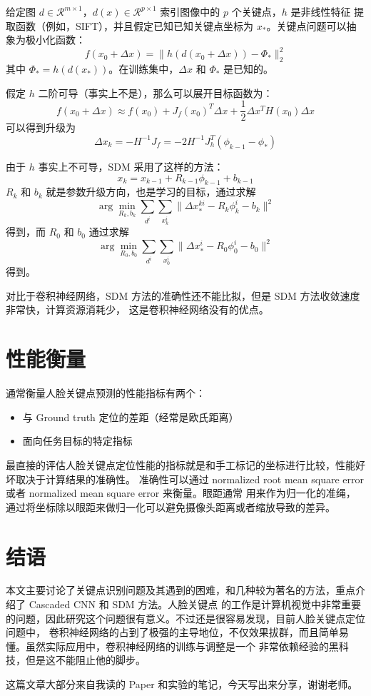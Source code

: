 \documentclass{ctexart}
\begin{document}
给定图 $d \in \mathcal{R}^{m\times 1}$，$d(x) \in \mathcal{R}^{p \times 1}$ 索引图像中的 $p$ 个关键点，$h$ 是非线性特征
提取函数（例如，SIFT），并且假定已知已知关键点坐标为 $x_*$。关键点问题可以抽象为极小化函数：
$$
f(x_0 + \Delta x) = \| h(d(x_0 + \Delta x)) - \Phi_* \|_2^2
$$
其中 $\Phi_* = h(d(x_*))$。在训练集中，$\Delta x$ 和 $\Phi_*$ 是已知的。

假定 $h$ 二阶可导（事实上不是），那么可以展开目标函数为：
$$
f(x_0 + \Delta x) \approx f(x_0) + J_f(x_0)^T \Delta x + \frac 1 2 \Delta x^T H(x_0) \Delta x
$$
可以得到升级为
$$
\Delta x_k = -H^{-1} J_f = -2 H^{-1} J_h^T(\phi_{k-1} - \phi_*)
$$

由于 $h$ 事实上不可导，SDM 采用了这样的方法：
$$
x_k = x_{k-1} + R_{k-1} \phi_{k-1} + b_{k-1}
$$
$R_k$ 和 $b_k$ 就是参数升级方向，也是学习的目标，通过求解
$$
\arg\min_{R_k, b_k} \sum_{d^i} \sum_{x_k^i} \| \Delta x_*^{ki} - R_k \phi_k^i - b_k \|^2
$$
得到，而 $R_0$ 和 $b_0$ 通过求解
$$
\arg\min_{R_0, b_0} \sum_{d^i} \sum_{x_0^i} \| \Delta x_*^{i} - R_0 \phi_0^i - b_0 \|^2
$$
得到。

对比于卷积神经网络，SDM 方法的准确性还不能比拟，但是 SDM 方法收敛速度非常快，计算资源消耗少，
这是卷积神经网络没有的优点。

\section{性能衡量}

通常衡量人脸关键点预测的性能指标有两个：

\begin{itemize}
	\item 与 Ground truth 定位的差距（经常是欧氏距离）
	\item 面向任务目标的特定指标
\end{itemize}

最直接的评估人脸关键点定位性能的指标就是和手工标记的坐标进行比较，性能好坏取决于计算结果的准确性。
准确性可以通过 normalized root mean square error 或者 normalized mean square error 来衡量。眼距通常
用来作为归一化的准绳，通过将坐标除以眼距来做归一化可以避免摄像头距离或者缩放导致的差异。

\section{结语}

本文主要讨论了关键点识别问题及其遇到的困难，和几种较为著名的方法，重点介绍了 Cascaded CNN 和 SDM 方法。人脸关键点
的工作是计算机视觉中非常重要的问题，因此研究这个问题很有意义。不过还是很容易发现，目前人脸关键点定位问题中，
卷积神经网络的占到了极强的主导地位，不仅效果拔群，而且简单易懂。虽然实际应用中，卷积神经网络的训练与调整是一个
非常依赖经验的黑科技，但是这不能阻止他的脚步。

这篇文章大部分来自我读的 Paper 和实验的笔记，今天写出来分享，谢谢老师。

\pagebreak

\end{document}

